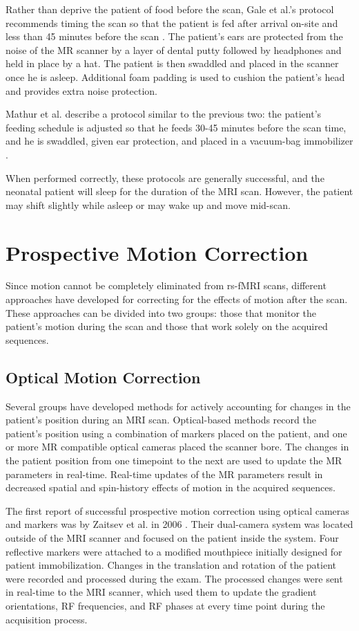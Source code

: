 Rather than deprive the patient of food before the scan, Gale et al.'s protocol recommends timing the scan so that the patient is fed after arrival on-site and less than 45 minutes before the scan \cite{Gale2013}. The patient's ears are protected from the noise of the MR scanner by a layer of dental putty followed by headphones and held in place by a hat. The patient is then swaddled and placed in the scanner once he is asleep. Additional foam padding is used to cushion the patient's head and provides extra noise protection.

Mathur et al. describe a protocol similar to the previous two: the patient's feeding schedule is adjusted so that he feeds 30-45 minutes before the scan time, and he is swaddled, given ear protection, and placed in a vacuum-bag immobilizer \cite{Mathur2008}.

When performed correctly, these protocols are generally successful, and the neonatal patient will sleep for the duration of the MRI scan. However, the patient may shift slightly while asleep or may wake up and move mid-scan.


\section{Prospective Motion Correction}

Since motion cannot be completely eliminated from rs-fMRI scans, different approaches have developed for correcting for the effects of motion after the scan. These approaches can be divided into two groups: those that monitor the patient's motion during the scan and those that work solely on the acquired sequences.

\subsection{Optical Motion Correction}

Several groups have developed methods for actively accounting for changes in the patient's position during an MRI scan. Optical-based methods record the patient's position using a combination of markers placed on the patient, and one or more MR compatible optical cameras placed the scanner bore. The changes in the patient position from one timepoint to the next are used to update the MR parameters in real-time. Real-time updates of the MR parameters result in decreased spatial and spin-history effects of motion in the acquired sequences.

The first report of successful prospective motion correction using optical cameras and markers was by Zaitsev et al. in 2006 \cite{Zaitsev2006}. Their dual-camera system was located outside of the MRI scanner and focused on the patient inside the system. Four reflective markers were attached to a modified mouthpiece initially designed for patient immobilization. Changes in the translation and rotation of the patient were recorded and processed during the exam. The processed changes were sent in real-time to the MRI scanner, which used them to update the gradient orientations, RF frequencies, and RF phases at every time point during the acquisition process.

